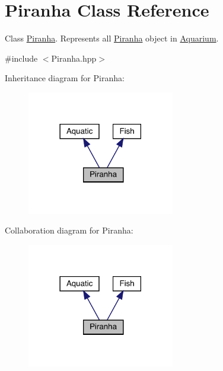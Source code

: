 \hypertarget{class_piranha}{}\section{Piranha Class Reference}
\label{class_piranha}


Class \mbox{\hyperlink{class_piranha}{Piranha}}. Represents all \mbox{\hyperlink{class_piranha}{Piranha}} object in \mbox{\hyperlink{class_aquarium}{Aquarium}}.  




{\ttfamily \#include $<$Piranha.\+hpp$>$}



Inheritance diagram for Piranha\+:\nopagebreak
\begin{figure}[H]
\begin{center}
\leavevmode
\includegraphics[width=182pt]{class_piranha__inherit__graph}
\end{center}
\end{figure}


Collaboration diagram for Piranha\+:\nopagebreak
\begin{figure}[H]
\begin{center}
\leavevmode
\includegraphics[width=182pt]{class_piranha__coll__graph}
\end{center}
\end{figure}
